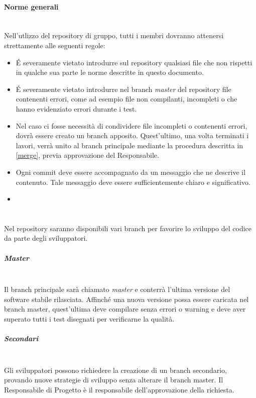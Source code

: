 \paragraph{Norme generali} \hfill \\
Nell'utlizzo del repository di gruppo, tutti i membri dovranno attenersi strettamente alle seguenti regole:
\begin{itemize}
\item \'E severamente vietato introdurre sul repository qualsiasi file che non rispetti in qualche sua parte le norme descritte in questo documento.
\item \'E severamente vietato introdurre nel branch \textit{master} del repository file contenenti errori, come ad esempio file non compilanti, incompleti o che hanno evidenziato errori durante i test.
\item Nel caso ci fosse necessità di condividere file incompleti o contenenti errori, dovrà essere creato un branch apposito. Quest'ultimo, una volta terminati i lavori, verrà unito al branch principale mediante la procedura descritta in \ref{merge}, previa approvazione del Responsabile.
\item Ogni commit deve essere accompagnato da un messaggio che ne descrive il contenuto. Tale messaggio deve essere sufficientemente chiaro e significativo.
\item 
\end{itemize}


\paragraph{} \hfill \\
\label{4.4}
Nel repository saranno disponibili vari branch per favorire lo sviluppo del codice da parte degli sviluppatori.

\subparagraph{Master} \hfill \\
\label{4.4.1}
Il branch principale sarà chiamato \textit{master} e conterrà l'ultima versione del software stabile rilasciata. Affinché una nuova versione possa essere caricata nel branch master, quest'ultima deve compilare senza errori o warning e deve aver superato tutti i test disegnati per verificarne la qualità.

\subparagraph{Secondari} \hfill \\
\label{4.4.2}
Gli sviluppatori possono richiedere la creazione di un branch secondario, provando nuove strategie di sviluppo senza alterare il branch master. Il Responsabile di Progetto è il responsabile dell'approvazione della richiesta.

